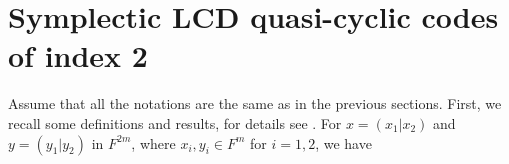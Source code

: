 \documentclass[a4paper,12pt]{article}
\begin{document}























\section{Symplectic LCD quasi-cyclic codes of index 2}
Assume that all the notations are the same as in the previous sections. First, we recall some definitions and results, for details see \cite[Section V]{ezerman2025}. 
 For $x=(x_1|x_2)$ and $y=(y_1|y_2)$ in $F^{2m}$, where $x_i,y_i\in F^m$ for $i=1,2$, we have 
 
\end{document}
